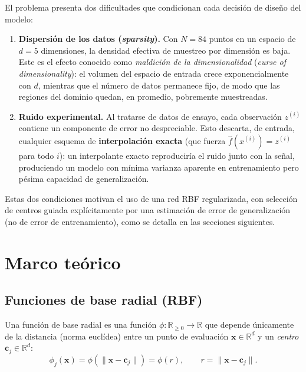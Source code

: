 \documentclass[11pt,a4paper]{article}
\newcommand{\R}{\mathbb{R}}
\begin{document}
El problema presenta dos dificultades que condicionan cada decisi\'on de
dise\~no del modelo:

\begin{enumerate}[label=(\alph*)]
    \item \textbf{Dispersi\'on de los datos (\emph{sparsity}).} Con $N=84$
    puntos en un espacio de $d=5$ dimensiones, la densidad efectiva de
    muestreo por dimensi\'on es baja. Este es el efecto conocido como
    \emph{maldici\'on de la dimensionalidad} (\emph{curse of dimensionality}):
    el volumen del espacio de entrada crece exponencialmente con $d$, mientras
    que el n\'umero de datos permanece fijo, de modo que las regiones del
    dominio quedan, en promedio, pobremente muestreadas.

    \item \textbf{Ruido experimental.} Al tratarse de datos de ensayo, cada
    observaci\'on $z^{(i)}$ contiene un componente de error no despreciable.
    Esto descarta, de entrada, cualquier esquema de \textbf{interpolaci\'on
    exacta} (que fuerza $\hat f(x^{(i)}) = z^{(i)}$ para todo $i$): un
    interpolante exacto reproducir\'ia el ruido junto con la se\~nal,
    produciendo un modelo con m\'inima varianza aparente en entrenamiento pero
    p\'esima capacidad de generalizaci\'on.
\end{enumerate}

Estas dos condiciones motivan el uso de una red RBF regularizada, con
selecci\'on de centros guiada expl\'icitamente por una estimaci\'on de error
de generalizaci\'on (no de error de entrenamiento), como se detalla en las
secciones siguientes.

\section{Marco te\'orico}

\subsection{Funciones de base radial (RBF)}

Una funci\'on de base radial es una funci\'on $\phi: \R_{\ge 0} \to \R$ que
depende \'unicamente de la distancia (norma eucl\'idea) entre un punto de
evaluaci\'on $\mathbf{x} \in \R^d$ y un \emph{centro} $\mathbf{c}_j \in \R^d$:
\[
\phi_j(\mathbf{x}) = \phi\!\left(\lVert \mathbf{x} - \mathbf{c}_j \rVert\right)
= \phi(r), \qquad r = \lVert \mathbf{x} - \mathbf{c}_j \rVert .
\]
\end{document}
